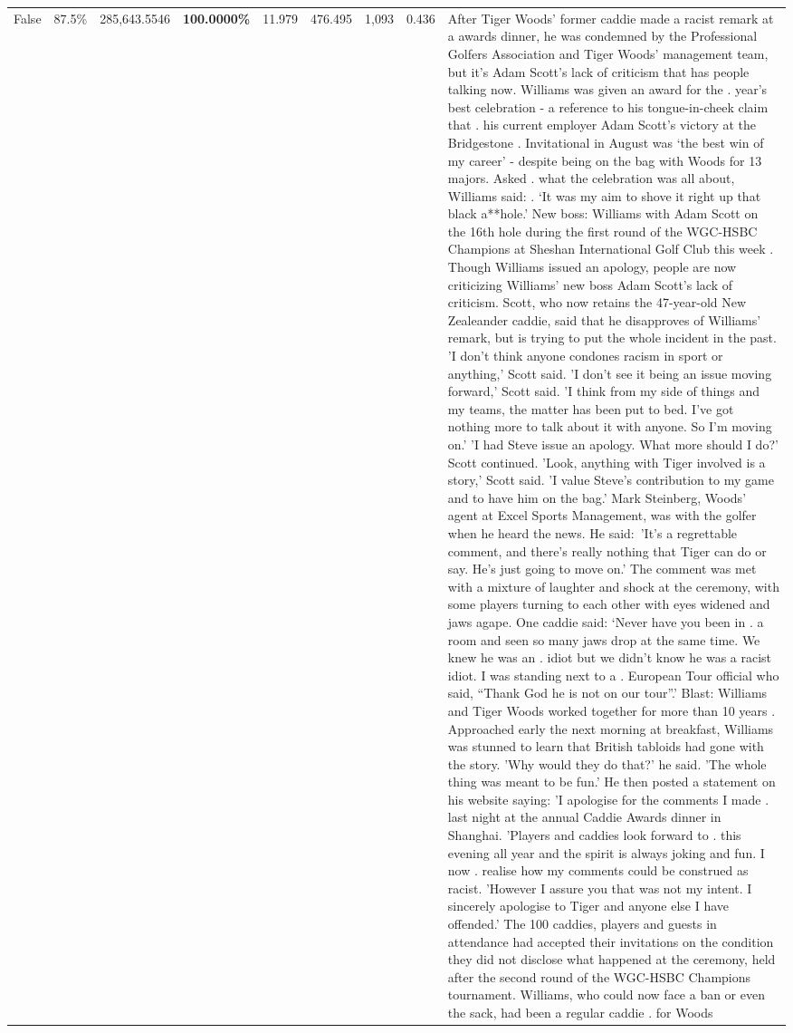 \begin{table}[H]
\begin{tabular}{lllrlllll}
False & 87.5\% & \color{red} 285,643.5546 & \bfseries \color{red} 100.0000\% & 11.979 & 476.495 & 1,093 & 0.436 & After Tiger Woods' former caddie made a racist remark at a awards dinner, he was condemned by the Professional Golfers Association and Tiger Woods' management team, but it's Adam Scott's lack of criticism that has people talking now. Williams was given an award for the . year’s best celebration - a reference to his tongue-in-cheek claim that . his current employer Adam Scott’s victory at the Bridgestone . Invitational in August was ‘the best win of my career’ - despite being on the bag with Woods for 13 majors. Asked . what the celebration was all about, Williams said: . ‘It was my aim to shove it right up that black a**hole.’ New boss: Williams with Adam Scott  on the 16th hole during the first round of the WGC-HSBC Champions at Sheshan International Golf Club this week . Though Williams issued an apology, people are now criticizing Williams' new boss Adam Scott's lack of criticism. Scott, who now retains the 47-year-old New Zealeander caddie, said that he disapproves of Williams' remark, but is trying to put the whole incident in the past. 'I don't think anyone condones racism in sport or anything,' Scott said. 'I don't see it being an issue moving forward,' Scott said. 'I think from my side of things and my teams, the matter has been put to bed. I've got nothing more to talk about it with anyone. So I'm moving on.' 'I had Steve issue an apology. What more should I do?' Scott continued. 'Look, anything with Tiger involved is a story,' Scott said. 'I value Steve's contribution to my game and to have him on the bag.' Mark Steinberg, Woods' agent at Excel Sports Management, was with the golfer when he heard the news. He said: 'It's a regrettable comment, and there's really nothing that Tiger can do or say. He's just going to move on.' The comment was met with a mixture of laughter and shock at the ceremony, with some players turning to each other with eyes widened and jaws agape. One caddie said: ‘Never have you been in . a room and seen so many jaws drop at the same time. We knew he was an . idiot but we didn’t know he was a racist idiot. I was standing next to a . European Tour official who said, “Thank God he is not on our tour”.’ Blast: Williams and Tiger Woods worked together for more than 10 years . Approached early the next morning at breakfast, Williams was stunned to learn that British tabloids had gone with the story. 'Why would they do that?' he said. 'The whole thing was meant to be fun.' He then posted a statement on his website saying: 'I apologise for the comments I made . last night at the annual Caddie Awards dinner in Shanghai. 'Players and caddies look forward to . this evening all year and the spirit is always joking and fun. I now . realise how my comments could be construed as racist. 'However I assure you that was not my intent. I sincerely apologise to Tiger and anyone else I have offended.' The 100 caddies, players and guests in attendance had accepted their invitations on the condition they did not disclose what happened at the ceremony, held after the second round of the WGC-HSBC Champions tournament. Williams, who could now face a ban or even the sack, had been a regular caddie . for Woods 
\end{tabular}
\end{table}
